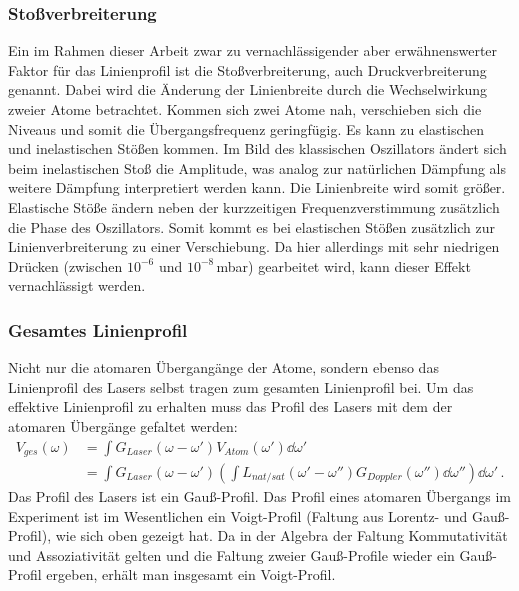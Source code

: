 \subsubsection{Stoßverbreiterung}\label{subsubsec:stossverbreiterung}
Ein im Rahmen dieser Arbeit zwar zu vernachlässigender aber erwähnenswerter
Faktor für das Linienprofil ist die Stoßverbreiterung, auch
Druckverbreiterung genannt. Dabei wird die Änderung der Linienbreite durch die
Wechselwirkung zweier Atome betrachtet. Kommen sich zwei Atome nah, verschieben
sich die Niveaus und somit die Übergangsfrequenz geringfügig. Es kann zu
elastischen und inelastischen Stößen kommen. Im Bild des klassischen Oszillators
ändert sich beim inelastischen Stoß die Amplitude, was analog zur natürlichen
Dämpfung als weitere Dämpfung interpretiert werden kann. Die Linienbreite wird
somit größer. Elastische Stöße ändern neben der kurzzeitigen Frequenzverstimmung
zusätzlich die Phase des Oszillators. Somit kommt es bei elastischen Stößen
zusätzlich zur Linienverbreiterung zu einer Verschiebung. Da hier allerdings mit
sehr niedrigen Drücken (zwischen $10^{-6}$ und $10^{-8}\,$mbar) gearbeitet wird, kann dieser Effekt vernachlässigt werden.

\subsubsection{Gesamtes Linienprofil}\label{subsubsec:ges-linienprofil}
Nicht nur die atomaren Übergangänge der Atome, sondern ebenso das Linienprofil
des Lasers selbst tragen zum gesamten Linienprofil bei. Um das effektive
Linienprofil zu erhalten muss das Profil des Lasers mit dem der atomaren
Übergänge gefaltet werden:
\begin{equation}\label{eq:voigt}
	\begin{split}
		V_{ges}(\omega)
		&=\int{G_{Laser}(\omega-\omega')V_{Atom}(\omega')\dd\omega'}\\
		&=\int{G_{Laser}(\omega-\omega')\left(\int{L_{nat/sat}(\omega'-\omega'')G_{Doppler}(\omega'')\dd\omega''}\right)\dd\omega'}\,.
	\end{split}
\end{equation}
Das Profil des Lasers ist ein Gauß-Profil. Das Profil eines atomaren Übergangs
im Experiment ist im Wesentlichen ein Voigt-Profil (Faltung aus Lorentz- und
Gauß-Profil), wie sich oben gezeigt hat. Da in der Algebra der Faltung
Kommutativität und Assoziativität gelten und die Faltung zweier Gauß-Profile
wieder ein Gauß-Profil ergeben, erhält man insgesamt ein Voigt-Profil.

